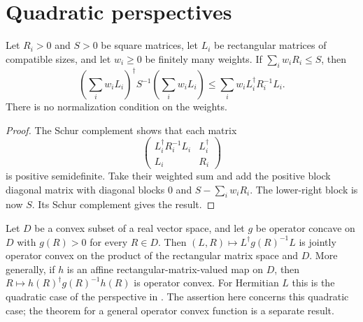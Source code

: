 \section{Quadratic perspectives}

\begin{lemma}
    \label{lem:finite_quadratic_perspective}
    \leanok
    Let $R_i>0$ and $S>0$ be square matrices, let $L_i$ be rectangular
    matrices of compatible sizes, and let $w_i\geq0$ be finitely many weights.
    If $\sum_i w_iR_i\leq S$, then
    \[
        \left(\sum_i w_iL_i\right)^\dagger S^{-1}
        \left(\sum_i w_iL_i\right)
        \leq \sum_i w_iL_i^\dagger R_i^{-1}L_i.
    \]
    There is no normalization condition on the weights.
\end{lemma}

\begin{proof}\leanok
    The Schur complement shows that each matrix
    \[
        \begin{pmatrix}L_i^\dagger R_i^{-1}L_i&L_i^\dagger\\L_i&R_i\end{pmatrix}
    \]
    is positive semidefinite. Take their weighted sum and add the positive
    block diagonal matrix with diagonal blocks $0$ and $S-\sum_iw_iR_i$.
    The lower-right block is now $S$. Its Schur complement gives the result.
\end{proof}

\begin{theorem}
    \label{thm:quadratic_perspective_concave_denominator}
    \leanok
    Let $D$ be a convex subset of a real vector space, and let $g$ be
    operator concave on $D$ with $g(R)>0$ for every $R\in D$.
    Then $(L,R)\mapsto L^\dagger g(R)^{-1}L$ is jointly operator convex
    on the product of the rectangular matrix space and $D$.
    More generally, if $h$ is an affine rectangular-matrix-valued map on $D$,
    then $R\mapsto h(R)^\dagger g(R)^{-1}h(R)$ is operator convex.
    For Hermitian $L$ this is the quadratic case of the perspective in
    \cite[Theorem~5.14]{Wolf2012Quantum}. The assertion here concerns this
    quadratic case; the theorem for a general operator convex function is
    a separate result.
\end{theorem}

